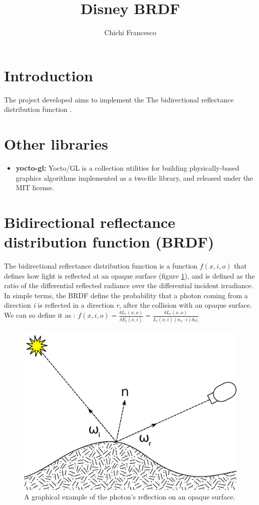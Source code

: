 \documentclass[11pt]{article}
\title{Disney BRDF}
\author{Chichi Francesco}
\begin{document}
\maketitle
\graphicspath{{img/}}
\section{Introduction}
	The project developed aims to implement the The bidirectional reflectance distribution function .
\section{Other libraries}
\begin{itemize}
	\item \textbf{yocto-gl:}
		Yocto/GL is a collection utilities for building physically-based graphics algorithms implemented as a two-file library, and released under the MIT license.
		
\end{itemize}

\newpage
\section{Bidirectional reflectance distribution function (BRDF)}
The bidirectional reflectance distribution function is a function $ f(x,i,o) $ that defines how light is reflected at an opaque surface (figure \ref{fig:reflect}), and is defined as the ratio of the differential reflected radiance over the
differential incident irradiance. 
In simple terms, the BRDF define the probability that a photon coming from a direction \textit{i} is reflected in a direction \textit{r}, after the collision with an opaque surface.
We can so define it as \cite{slide}:
$f(x,i,o)=\frac{\delta L_r(x,o)}{\delta E_i(x,i)} = \frac{\delta L_r(x,o)}{L_i(x,i)(n_x\cdot i) \delta \omega_i} $

\begin{figure}
	\centering
	\includegraphics[width=0.5\linewidth]{img/reflect}
	\caption{A graphical example of the photon's reflection on an opaque surface.}
	\label{fig:reflect}
\end{figure}
\end{document}
